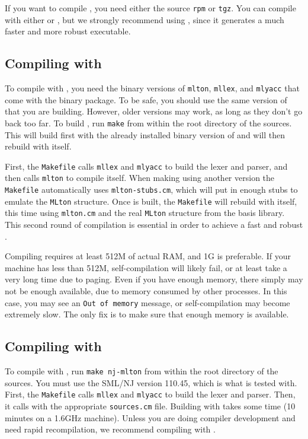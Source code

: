 %
If you want to compile {\mlton}, you need either the source {\tt rpm}
or {\tt tgz}.  You can compile with either {\mlton} or {\smlnj}, but
we strongly recommend using {\mlton}, since it generates a much faster
and more robust executable.  
%
\subsection{Compiling with {\mlton}}

To compile with {\mlton}, you need the binary versions of {\tt mlton},
{\tt mllex}, and {\tt mlyacc} that come with the {\mlton} binary
package.  To be safe, you should use the same version of {\mlton} that
you are building.  However, older versions may work, as long as they
don't go back too far.  To build {\mlton}, run {\tt make} from within
the root directory of the sources.  This will build {\mlton} first
with the already installed binary version of {\mlton} and will then
rebuild {\mlton} with itself.

First, the {\tt Makefile} calls {\tt mllex} and {\tt mlyacc} to build
the lexer and parser, and then calls {\tt mlton} to compile itself.
When making {\mlton} using another version the {\tt Makefile}
automatically uses {\tt mlton-stubs.cm}, which will put in enough
stubs to emulate the {\tt MLton} structure.  Once {\mlton} is built,
the {\tt Makefile} will rebuild {\mlton} with itself, this time using
{\tt mlton.cm} and the real {\tt MLton} structure from the basis
library.  This second round of compilation is essential in order to
achieve a fast and robust {\mlton}.

Compiling {\mlton} requires at least 512M of actual RAM, and 1G is
preferable.  If your machine has less than 512M, self-compilation will
likely fail, or at least take a very long time due to paging.  Even if
you have enough memory, there simply may not be enough available, due
to memory consumed by other processes.  In this case, you may see an
{\tt Out of memory} message, or self-compilation may become extremely
slow.  The only fix is to make sure that enough memory is available.
%
\subsection{Compiling with {\smlnj}}

To compile with {\smlnj}, run {\tt make nj-mlton} from within the root
directory of the sources.  You must use the SML/NJ version 110.45,
which is what {\mlton} is tested with.  First, the {\tt Makefile}
calls {\tt mllex} and {\tt mlyacc} to build the lexer and parser.
Then, it calls {\smlnj} with the appropriate {\tt sources.cm} file.
Building with {\smlnj} takes some time (10 minutes on a 1.6GHz
machine).  Unless you are doing compiler development and need rapid
recompilation, we recommend compiling with {\mlton}.
